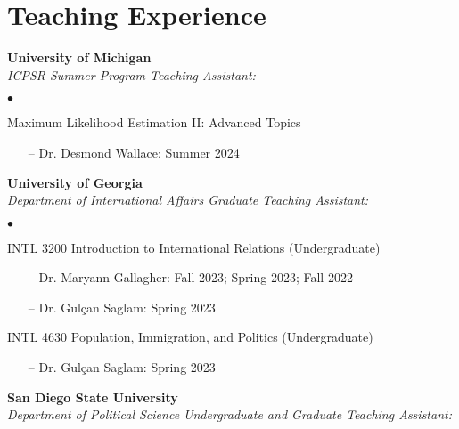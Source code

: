 \documentclass[letterpaper,12pt]{article}
\newenvironment{list2}{
  \begin{list}{$\bullet$}{%
      \setlength{\itemsep}{0in}
      \setlength{\parsep}{0in} 
      \setlength{\parskip}{0in}
      \setlength{\topsep}{0in} 
      \setlength{\partopsep}{0in}
      \setlength{\leftmargin}{1in}
      \setlength{\labelsep}{1em}
      \setlength{\labelwidth}{1em}
      \setlength{\itemindent}{-2em}
      \setlength{\listparindent}{2em}}}{\end{list}}
\begin{document}
\section{Teaching Experience}
\textbf{University of Michigan}\\
\textit{ICPSR Summer Program Teaching Assistant:}
\begin{list2}
    \item Maximum Likelihood Estimation II: Advanced Topics
        \begin{enumerate}[leftmargin=!,labelindent=0pt,itemindent=-15pt]
            \item[--] Dr. Desmond Wallace: Summer 2024
        \end{enumerate}
\end{list2}
\par
\textbf{University of Georgia}\\
\textit{Department of International Affairs Graduate Teaching Assistant:}
\begin{list2}
    \item INTL 3200 Introduction to International Relations (Undergraduate)
        \begin{enumerate}[leftmargin=!,labelindent=0pt,itemindent=-15pt]
            \item[--] Dr. Maryann Gallagher: Fall 2023; Spring 2023; Fall 2022
            \item[--] Dr. Gulçan Saglam: Spring 2023
        \end{enumerate}
    \item INTL 4630 Population, Immigration, and Politics (Undergraduate)
        \begin{enumerate}[leftmargin=!,labelindent=0pt,itemindent=-15pt]
            \item[--] Dr. Gulçan Saglam: Spring 2023
        \end{enumerate}
\end{list2}
\par
\textbf{San Diego State University}\\
\textit{Department of Political Science Undergraduate and Graduate Teaching Assistant:}
\end{document}
